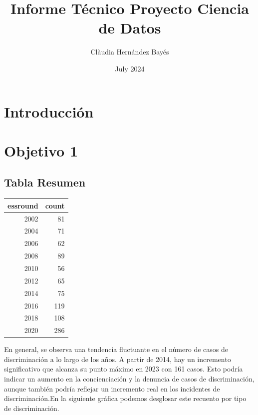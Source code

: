 \documentclass{article}
\title{Informe Técnico Proyecto Ciencia de Datos}
\author{Clàudia Hernández Bayés}
\date{July 2024}
\begin{document}


\maketitle
\tableofcontents


\section*{Introducción}


\section*{Objetivo 1}
\subsection{Tabla Resumen}

\begin{table}[ht]
\centering
\begin{tabular}{rr}
  \hline
essround & count \\ 
  \hline
2002 &  81 \\ 
  2004 &  71 \\ 
  2006 &  62 \\ 
  2008 &  89 \\ 
  2010 &  56 \\ 
  2012 &  65 \\ 
  2014 &  75 \\ 
  2016 & 119 \\ 
  2018 & 108 \\ 
  2020 & 286 \\ 
   \hline
\end{tabular}
\end{table}
En general, se observa una tendencia fluctuante en el número de casos de discriminación a lo largo de los años. A partir de 2014, hay un incremento significativo que alcanza su punto máximo en 2023 con 161 casos. Esto podría indicar un aumento en la concienciación y la denuncia de casos de discriminación, aunque también podría reflejar un incremento real en los incidentes de discriminación.En la siguiente gráfica podemos desglosar este recuento por tipo de discriminación. 
\end{document}

